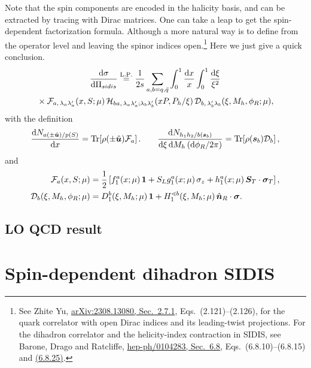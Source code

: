 \documentclass[a4paper,11pt]{article}
\begin{document}
Note that the spin components are encoded in the halicity basis, and can be extracted by tracing with Dirac matrices.
One can take a leap to get the spin-dependent factorization formula. Although a more natural way is to define from the operator level and leaving the spinor indices open.\footnote{See Zhite Yu,
\href{https://arxiv.org/pdf/2308.13080v1\#page=86}{arXiv:2308.13080, Sec.~2.7.1},
Eqs.~(2.121)--(2.126), for the quark correlator with open Dirac indices
and its leading-twist projections. For the dihadron correlator and the
helicity-index contraction in SIDIS, see Barone, Drago and Ratcliffe,
\href{https://arxiv.org/pdf/hep-ph/0104283v3\#page=102}{hep-ph/0104283, Sec.~6.8},
Eqs.~(6.8.10)--(6.8.15) and
\href{https://arxiv.org/pdf/hep-ph/0104283v3\#page=106}{(6.8.25)}.}
Here we just give a quick conclusion.
\begin{multline}
    \frac{\dd\sigma}{\dd\Pi_{sidis}}
    \overset{\rm L.P.}{=}\frac{1}{2s}\sum_{a,b=q,\bar q}
        \int_0^1\frac{\dd x}{x}\int_0^1\frac{\dd\xi}{\xi^2}\\
    {}\times {\cal F}_{a,\,\lambda_a\lambda'_a}(x,S;\mu)\,
        {\cal H}_{ba,\,\lambda_a\lambda_a';\lambda_b\lambda_b'}(xP,P_h/\xi)\,
        {\cal D}_{b,\,\lambda_b'\lambda_b}(\xi,M_h,\phi_R;\mu),
    \label{eq:sidis-spin-conv}
\end{multline}
with the definition
\begin{equation}
    \frac{\dd N_{a(\pm\hat{\bm u})/p(S)}}{\dd x}
    =\operatorname{Tr}\!\left[\rho(\pm\hat{\bm u}){\cal F}_a\right].\qquad
    \frac{\dd N_{h_1h_2/b(\bm s_b)}}{\dd\xi\,\dd M_h\,(\dd\phi_R/2\pi)}
         =\operatorname{Tr}\!\left[\rho(\bm s_b){\cal D}_b\right],
\end{equation}
and
\begin{align}
    {\cal F}_a(x,S;\mu)
        &=\frac{1}{2}\left[f_1^a(x;\mu)\,\mathbf 1
            +S_Lg_1^a(x;\mu)\,\sigma_z
            +h_1^a(x;\mu)\,\bm S_T\cdot\bm\sigma_T\right],\\
        {\cal D}_b(\xi,M_h,\phi_R;\mu)
        &=D_1^b(\xi,M_h;\mu)\,\mathbf 1
            +H_1^{\sphericalangle b}(\xi,M_h;\mu)\,\hat{\bm n}_R\cdot\bm\sigma.
\end{align}

\subsection{LO QCD result}

\clearpage
\section{Spin-dependent dihadron SIDIS}
\label{sec:sidis-formulae}
\end{document}
